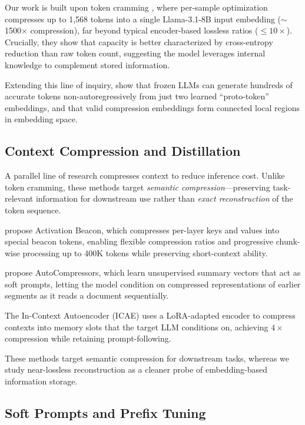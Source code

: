 \documentclass{article}
\theoremstyle{plain}
\theoremstyle{definition}
\theoremstyle{remark}
\begin{document}
Our work is built upon token cramming \cite{kuratov2025cramming}, where per-sample optimization compresses up to 1{,}568 tokens into a single Llama-3.1-8B input embedding ($\sim$1500$\times$ compression), far beyond typical encoder-based lossless ratios ($\le 10\times$). Crucially, they show that capacity is better characterized by cross-entropy reduction than raw token count, suggesting the model leverages internal knowledge to complement stored information.

Extending this line of inquiry, \citet{mezentsev2025exploring} show that frozen LLMs can generate hundreds of accurate tokens non-autoregressively from just two learned ``proto-token'' embeddings, and that valid compression embeddings form connected local regions in embedding space.


\subsection{Context Compression and Distillation}

A parallel line of research compresses context to reduce inference cost. Unlike token cramming, these methods target \emph{semantic compression}---preserving task-relevant information for downstream use rather than \emph{exact reconstruction} of the token sequence.

\citet{zhang2025activations_beacon} propose Activation Beacon, which compresses per-layer keys and values into special beacon tokens, enabling flexible compression ratios and progressive chunk-wise processing up to 400K tokens while preserving short-context ability.

\citet{chevalier-etal-2023-autocompressors} propose AutoCompressors, which learn unsupervised summary vectors that act as soft prompts, letting the model condition on compressed representations of earlier segments as it reads a document sequentially.

The In-Context Autoencoder (ICAE) \cite{ge2024ICAE} uses a LoRA-adapted encoder to compress contexts into memory slots that the target LLM conditions on, achieving $4\times$ compression while retaining prompt-following.

These methods target semantic compression for downstream tasks, whereas we study near-lossless reconstruction as a cleaner probe of embedding-based information storage.

\subsection{Soft Prompts and Prefix Tuning}
\end{document}
